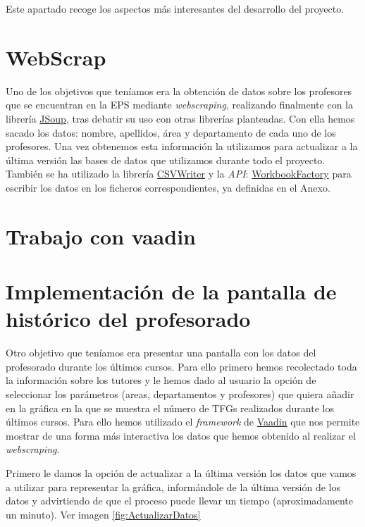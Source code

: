 
Este apartado recoge los aspectos más interesantes del desarrollo del proyecto.

\section{WebScrap}

Uno de los objetivos que teníamos era la obtención de datos sobre los profesores que se encuentran en la EPS mediante \emph{webscraping}, realizando finalmente con la librería \href{https://jsoup.org/}{JSoup}, tras debatir su uso con otras librerías planteadas. 
Con ella hemos sacado los datos: nombre, apellidos, área y departamento de cada uno de los profesores. Una vez obtenemos esta información la utilizamos para actualizar a la última versión las bases de datos que utilizamos durante todo el proyecto.
También se ha utilizado la librería \href{https://opencsv.sourceforge.net/apidocs/com/opencsv/CSVWriter.html}{CSVWriter} y la \emph{API}: \href{https://poi.apache.org/apidocs/dev/org/apache/poi/ss/usermodel/WorkbookFactory.html}{WorkbookFactory} para escribir los datos en los ficheros correspondientes, ya definidas en el Anexo.


\section{Trabajo con vaadin}


\section{Implementación de la pantalla de histórico del profesorado}
Otro objetivo que teníamos era presentar una pantalla con los datos del profesorado durante los últimos cursos. 
Para ello primero hemos recolectado toda la información sobre los tutores y le hemos dado al usuario la opción de seleccionar los parámetros (areas, departamentos y profesores) que quiera añadir en la gráfica en la que se muestra el número de TFGs realizados durante los últimos cursos.
Para ello hemos utilizado el \emph{framework} de \href{https://vaadin.com/}{Vaadin} que nos permite mostrar de una forma más interactiva los datos que hemos obtenido al realizar el \emph{webscraping}.

Primero le damos la opción de actualizar a la última versión los datos que vamos a utilizar para representar la gráfica, informándole de la última versión de los datos y advirtiendo de que el proceso puede llevar un tiempo (aproximadamente un minuto). Ver imagen \ref{fig:ActualizarDatos}


